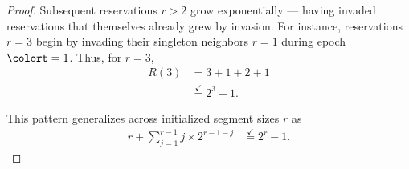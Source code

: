 \begin{proof}
Subsequent reservations $r>2$ grow exponentially --- having invaded reservations that themselves already grew by invasion.
For instance, reservations $r=3$ begin by invading their singleton neighbors $r=1$ during epoch $\colort=1$.
Thus, for $r=3$,
\begin{align*}
R(3)
&= 3 + 1 + 2 + 1\\
&\stackrel{\checkmark}{=} 2^3 - 1.
\end{align*}

This pattern generalizes across initialized segment sizes $r$ as
\begin{align*}
r + \sum_{j=1}^{r-1} j \times 2^{r-1-j}
&\stackrel{\checkmark}{=} 2^{r} - 1.
\end{align*}

\end{proof}



